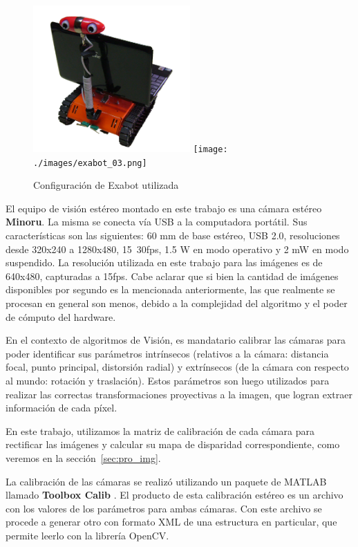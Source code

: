 \documentclass[journal]{IEEEtran}
\begin{document}
\begin{figure}[ht]
	\begin{center}
		\includegraphics[width=6cm]{./images/exabot_04.png}
		\texttt{[image: ./images/exabot\_03.png]}
		\caption{Configuraci\'on de Exabot utilizada}
	\end{center}
\end{figure}

El equipo de visi\'on est\'ereo montado en este trabajo es una c\'amara est\'ereo {\bf Minoru}. La misma se conecta v\'ia USB a la computadora port\'atil. Sus caracter\'isticas son las siguientes: 60 mm de base est\'ereo, USB 2.0, resoluciones desde 320x240 a 1280x480, 15~30fps, 1.5 W en modo operativo y 2 mW en modo suspendido. La resoluci\'on utilizada en este trabajo para las im\'agenes es de 640x480, capturadas a 15fps. Cabe aclarar que si bien la cantidad de im\'agenes disponibles por segundo es la mencionada anteriormente, las que realmente se procesan en general son menos, debido a la complejidad del algoritmo y el poder de c\'omputo del hardware.

En el contexto de algoritmos de Visi\'on, es mandatario calibrar las c\'amaras para poder identificar sus par\'ametros intr\'insecos (relativos a la c\'amara: distancia focal, punto principal, distorsi\'on radial) y extr\'insecos (de la c\'amara con respecto al mundo: rotaci\'on y traslaci\'on). Estos par\'ametros son luego utilizados para realizar las correctas transformaciones proyectivas a la imagen, que logran extraer informaci\'on de cada p\'ixel.

En este trabajo, utilizamos la matriz de calibraci\'on de cada c\'amara para rectificar las im\'agenes y calcular su mapa de disparidad correspondiente, como veremos en la secci\'on~\ref{sec:pro_img}.

La calibraci\'on de las c\'amaras se realiz\'o utilizando un paquete de MATLAB llamado {\bf Toolbox Calib} \cite{B00}. El producto de esta calibraci\'on est\'ereo es un archivo con los valores de los par\'ametros para ambas c\'amaras. Con este archivo se procede a generar otro con formato XML de una estructura en particular, que permite leerlo con la librer\'ia OpenCV.
\end{document}
